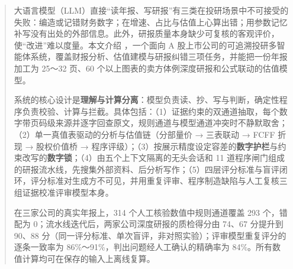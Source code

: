 \begin{abstract}
大语言模型（LLM）直接“读年报、写研报”有三类在投研场景中不可接受的失败：编造或记错财务数字；在增速、占比与估值上心算出错；用参数记忆补写没有出处的外部信息。此外，研报质量本身缺少可复核的客观评价，使“改进”难以度量。本文介绍 \sysname{}，一个面向 A 股上市公司的可追溯投研多智能体系统，覆盖财报分析、估值建模与研报纠错三项任务，并能把一份年报加工为 25～32 页、60 个以上图表的卖方体例深度研报和公式联动的估值模型。

系统的核心设计是\textbf{理解与计算分离}：模型负责读、抄、写与判断，确定性程序负责校验、计算与拦截。具体包括：（1）证据约束的双通道抽取，每个数字带页码级来源并逐字回查原文，规则通道与模型通道冲突时不静默取舍；（2）单一真值表驱动的分析与估值链（分部量价 → 三表联动 → FCFF 折现 → 股权价值桥 → 程序评级）；（3）按展示精度设定容差的\textbf{数字护栏}与约束改写的\textbf{数字锁}；（4）由五个上下文隔离的无头会话和 11 道程序闸门组成的研报流水线，先搜集外部资料、后分析写作；（5）四层评分标准与盲评闭环，评分标准对生成方不可见，并用重复评审、程序制造缺陷与人工复核三组证据校准评审模型本身。

在三家公司的真实年报上，314 个人工核验数值中规则通道覆盖 293 个，错配为 0；流水线迭代后，两家公司深度研报的质检得分由 74、67 分提升到 90、88 分（同一评分标准、单次盲评，非对照实验）；评审模型重复评分的逐条一致率为 86\%～91\%，判出问题经人工确认的精确率为 84\%。所有数值计算均可在保存的输入上离线复算。
\end{abstract}
